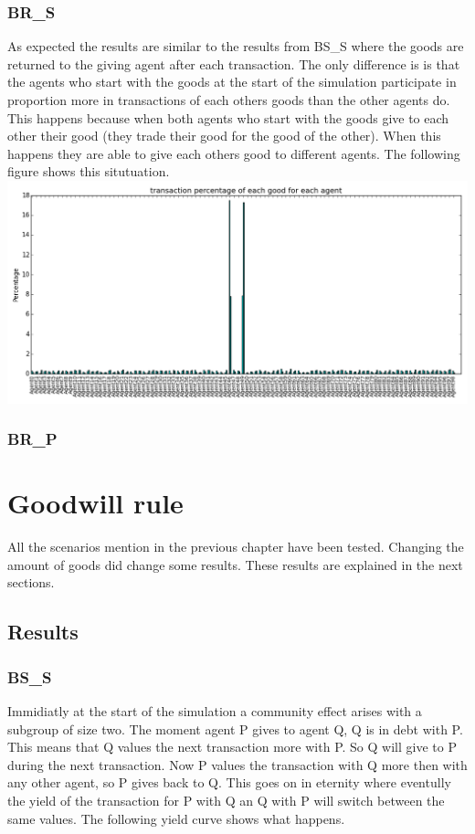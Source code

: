 \documentclass[twoside,openright]{uva-bachelor-thesis}
\begin{document}
\subsubsection{BR\_S}
As expected the results are similar to the results from BS\_S where the goods are returned to the giving agent after each transaction. The only difference is is that the agents who start with the goods at the start of the simulation participate in proportion more in transactions of each others goods than the other agents do. This happens because when both agents who start with the goods give to each other their good (they trade their good for the good of the other). When this happens they are able to give each others good to different agents. The following figure shows this situtuation. \\
\includegraphics[scale=0.4]{experiment_images/BR_S}


\subsubsection{BR\_P}

\section{Goodwill rule}
All the scenarios mention in the previous chapter have been tested. Changing the amount of goods did change some results. These results are explained in the next sections.
\subsection{Results}

\subsubsection{BS\_S}
Immidiatly at the start of the simulation a community effect arises with a subgroup of size two. The moment agent P gives to agent Q, Q is in debt with P. This means that Q values the next transaction more with P. So Q will give to P during the next transaction. Now P values the transaction with Q more then with any other agent, so P gives back to Q. This goes on in eternity where eventully the yield of the transaction for P with Q an Q with P will switch between the same values. The following yield curve shows what happens. 
\end{document}
